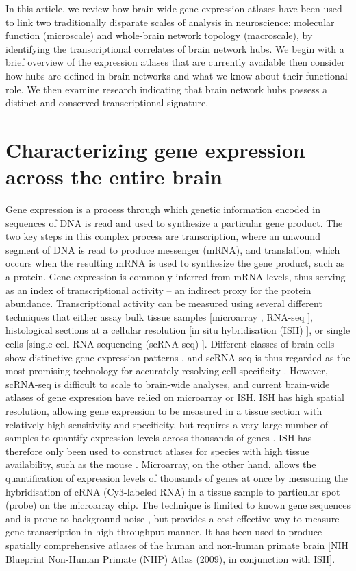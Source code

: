 In this article, we review how brain-wide gene expression atlases have been used to link two traditionally disparate scales of analysis in neuroscience: molecular function (microscale) and whole-brain network topology (macroscale), by identifying the transcriptional correlates of brain network hubs. We begin with a brief overview of the expression atlases that are currently available then consider how hubs are defined in brain networks and what we know about their functional role. We then examine research indicating that brain network hubs possess a distinct and conserved transcriptional signature.

\section{Characterizing gene expression across the entire brain}

Gene expression is a process through which genetic information encoded in sequences of DNA is read and used to synthesize a particular gene product.
The two key steps in this complex process are transcription, where an unwound segment of DNA is read to produce messenger (mRNA), and translation, which occurs when the resulting mRNA is used to synthesize the gene product, such as a protein. Gene expression is commonly inferred from mRNA levels, thus serving as an index of transcriptional activity -- an indirect proxy for the protein abundance.
Transcriptional activity can be measured using several different techniques that either assay bulk tissue samples [microarray \citep{Schulze2001}, RNA-seq \citep{Mortazavi2008,Wang2009}], histological sections at a cellular resolution [in situ hybridisation (ISH) \citep{Unger2010}], or single cells [single-cell RNA sequencing (scRNA-seq) \citep{Tang2009}].
Different classes of brain cells show distinctive gene expression patterns \citep{Darmanis2015,Tasic2016,Poulin2016,Mancarci2017}, and scRNA-seq is thus regarded as the most promising technology for accurately resolving cell specificity \citep{Yu2016}.
However, scRNA-seq is difficult to scale to brain-wide analyses, and current brain-wide atlases of gene expression have relied on microarray or ISH.
ISH has high spatial resolution, allowing gene expression to be measured in a tissue section with relatively high sensitivity and specificity, but requires a very large number of samples to quantify expression levels across thousands of genes \citep{Unger2010}.
ISH has therefore only been used to construct atlases for species with high tissue availability, such as the mouse \citep{Lein2007a}.
Microarray, on the other hand, allows the quantification of expression levels of thousands of genes at once by measuring the hybridisation of cRNA (Cy3-labeled RNA) in a tissue sample to particular spot (probe) on the microarray chip.
The technique is limited to known gene sequences and is prone to background noise \citep{Okoniewski2006,Royce2007}, but provides a cost-effective way to measure gene transcription in high-throughput manner. It has been used to produce spatially comprehensive atlases of the human \citep{Kang2011,Hawrylycz2012,Miller2014} and non-human primate brain [NIH Blueprint Non-Human Primate (NHP) Atlas (2009), in conjunction with ISH].

